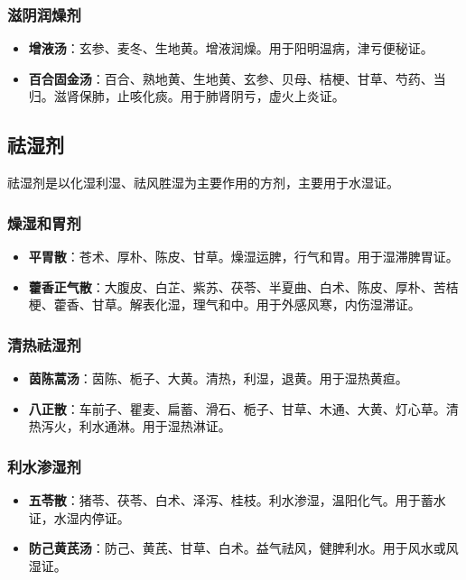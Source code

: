 \documentclass[12pt,UTF8]{ctexbook}
\begin{document}
\subsubsection{滋阴润燥剂}

\begin{itemize}
\item \textbf{增液汤}：玄参、麦冬、生地黄。增液润燥。用于阳明温病，津亏便秘证。
\item \textbf{百合固金汤}：百合、熟地黄、生地黄、玄参、贝母、桔梗、甘草、芍药、当归。滋肾保肺，止咳化痰。用于肺肾阴亏，虚火上炎证。
\end{itemize}

\subsection{祛湿剂}

祛湿剂是以化湿利湿、祛风胜湿为主要作用的方剂，主要用于水湿证。

\subsubsection{燥湿和胃剂}

\begin{itemize}
\item \textbf{平胃散}：苍术、厚朴、陈皮、甘草。燥湿运脾，行气和胃。用于湿滞脾胃证。
\item \textbf{藿香正气散}：大腹皮、白芷、紫苏、茯苓、半夏曲、白术、陈皮、厚朴、苦桔梗、藿香、甘草。解表化湿，理气和中。用于外感风寒，内伤湿滞证。
\end{itemize}

\subsubsection{清热祛湿剂}

\begin{itemize}
\item \textbf{茵陈蒿汤}：茵陈、栀子、大黄。清热，利湿，退黄。用于湿热黄疸。
\item \textbf{八正散}：车前子、瞿麦、扁蓄、滑石、栀子、甘草、木通、大黄、灯心草。清热泻火，利水通淋。用于湿热淋证。
\end{itemize}

\subsubsection{利水渗湿剂}

\begin{itemize}
\item \textbf{五苓散}：猪苓、茯苓、白术、泽泻、桂枝。利水渗湿，温阳化气。用于蓄水证，水湿内停证。
\item \textbf{防己黄芪汤}：防己、黄芪、甘草、白术。益气祛风，健脾利水。用于风水或风湿证。
\end{itemize}
\end{document}
